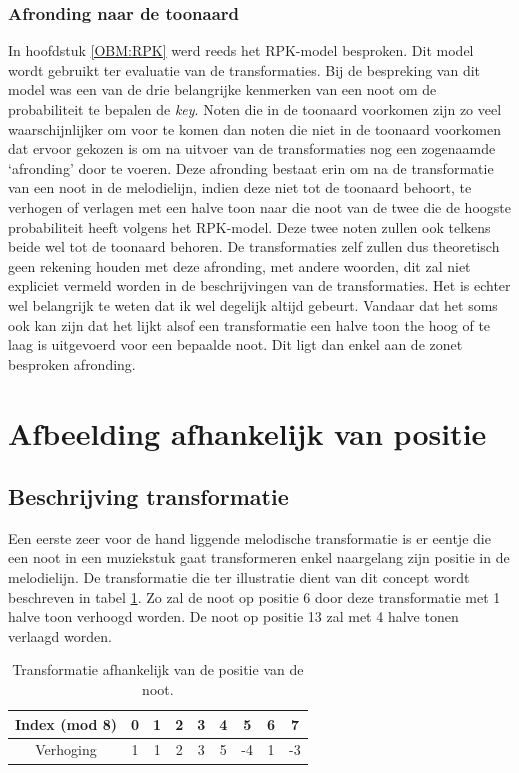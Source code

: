 \subsubsection{Afronding naar de toonaard}
\label{sub:afronding}
In hoofdstuk \ref{OBM:RPK} werd reeds het RPK-model besproken. Dit model wordt gebruikt ter evaluatie van de transformaties. Bij de bespreking van dit model was een van de drie belangrijke kenmerken van een noot om de probabiliteit te bepalen de \textit{key}. Noten die in de toonaard voorkomen zijn zo veel waarschijnlijker om voor te komen dan noten die niet in de toonaard voorkomen dat ervoor gekozen is om na uitvoer van de transformaties nog een zogenaamde `afronding' door te voeren. Deze afronding bestaat erin om na de transformatie van een noot in de melodielijn, indien deze niet tot de toonaard behoort, te verhogen of verlagen met een halve toon naar die noot van de twee die de hoogste probabiliteit heeft volgens het RPK-model. Deze twee noten zullen ook telkens beide wel tot de toonaard behoren. De transformaties zelf zullen dus theoretisch geen rekening houden met deze afronding, met andere woorden, dit zal niet expliciet vermeld worden in de beschrijvingen van de transformaties. Het is echter wel belangrijk te weten dat ik wel degelijk altijd gebeurt. Vandaar dat het soms ook kan zijn dat het lijkt alsof een transformatie een halve toon the hoog of te laag is uitgevoerd voor een bepaalde noot. Dit ligt dan enkel aan de zonet besproken afronding.

\section{Afbeelding afhankelijk van positie}
\subsection{Beschrijving transformatie}
Een eerste zeer voor de hand liggende melodische transformatie is er eentje die een noot in een muziekstuk gaat transformeren enkel naargelang zijn positie in de melodielijn. De transformatie die ter illustratie dient van dit concept wordt beschreven in tabel \ref{tabel:transformatie1}. Zo zal de noot op positie 6 door deze transformatie met 1 halve toon verhoogd worden. De noot op positie 13 zal met 4 halve tonen verlaagd worden. 

\begin{table}
  \centering
  \begin{tabular}{c | c c c c c c c c }
    Index (mod 8) & 0 & 1 & 2 & 3 & 4 & 5 & 6 & 7 \\
    \hline
    \hline
    Verhoging & 1 & 1 & 2 & 3 & 5 & -4 & 1 & -3 \\
  \end{tabular}
  \caption{Transformatie afhankelijk van de positie van de noot.}
  \label{tabel:transformatie1}
\end{table}

